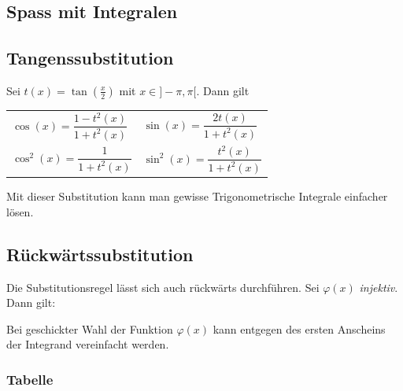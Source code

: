 \begin{multicols*}{2}
    \section{Spass mit Integralen}

    \subsection{Tangenssubstitution}

    Sei $t(x) = \tan(\frac{x}{2})$ mit $x \in ]-\pi, \pi[$. Dann gilt

    \begin{center}
        \renewcommand{\arraystretch}{1.5}
        \begin{tabular}{l l} \toprule
            $\cos(x) = \dfrac{1 - t^2(x)}{1 + t^2(x)}$ & $\sin(x) = \dfrac{2 t(x)}{1 + t^2(x)}$   \\
            $\cos^2(x) = \dfrac{1}{1 + t^2(x)}$        & $\sin^2(x) = \dfrac{t^2(x)}{1 + t^2(x)}$ \\
            \bottomrule
        \end{tabular}
    \end{center}

    Mit dieser Substitution kann man gewisse Trigonometrische Integrale einfacher lösen.
    \subsection{Rückwärtssubstitution}

    Die Substitutionsregel lässt sich auch rückwärts durchführen. Sei $\varphi(x)$ \emph{injektiv}. Dann gilt:

    \begin{center}
    \end{center}

    Bei geschickter Wahl der Funktion $\varphi(x)$ kann entgegen des ersten Anscheins der Integrand vereinfacht werden.

    \subsubsection{Tabelle}


\end{multicols*}
